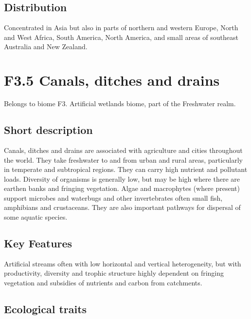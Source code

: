 \documentclass[
  letterpaper,
  DIV=11,
  numbers=noendperiod]{scrartcl}
\begin{document}
\subsection{Distribution}\label{distribution-129}

Concentrated in Asia but also in parts of northern and western Europe,
North and West Africa, South America, North America, and small areas of
southeast Australia and New Zealand.

\section{F3.5 Canals, ditches and
drains}\label{f3.5-canals-ditches-and-drains-1}

Belongs to biome F3. Artificial wetlands biome, part of the Freshwater
realm.

\subsection{Short description}\label{short-description-130}

Canals, ditches and drains are associated with agriculture and cities
throughout the world. They take freshwater to and from urban and rural
areas, particularly in temperate and subtropical regions. They can carry
high nutrient and pollutant loads. Diversity of organisms is generally
low, but may be high where there are earthen banks and fringing
vegetation. Algae and macrophytes (where present) support microbes and
waterbugs and other invertebrates often small fish, amphibians and
crustaceans. They are also important pathways for dispersal of some
aquatic species.

\subsection{Key Features}\label{key-features-130}

Artificial streams often with low horizontal and vertical heterogeneity,
but with productivity, diversity and trophic structure highly dependent
on fringing vegetation and subsidies of nutrients and carbon from
catchments.

\subsection{Ecological traits}\label{ecological-traits-130}
\end{document}
